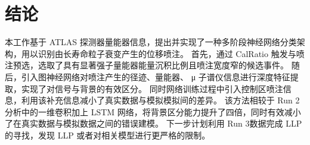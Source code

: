 
\chapter{结论}
本工作基于 ATLAS 探测器量能器信息，提出并实现了一种多阶段神经网络分类架构，用以识别由长寿命粒子衰变产生的位移喷注。
首先，通过 CalRatio 触发与喷注预选，选取了具有显著强子量能器能量沉积比例且喷注宽度窄的候选事件。
随后，引入图神经网络对喷注产生的径迹、量能器、 μ 子谱仪信息进行深度特征提取，实现了对信号与背景的有效区分。
同时网络训练过程中引入控制区喷注信息，利用该补充信息减小了真实数据与模拟模拟间的差异。
该方法相较于 Run 2 分析中的一维卷积加上 LSTM 网络，将背景区分能力提升了四倍，同时有效减小了在真实数据与模拟数据之间的错误建模。
下一步计划利用 Run 3数据完成 LLP 的寻找，发现 LLP 或者对相关模型进行更严格的限制。
